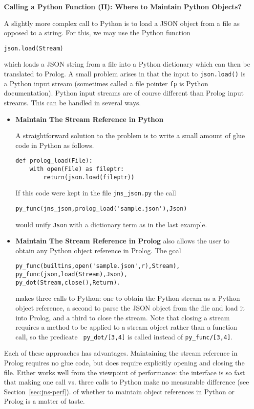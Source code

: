 \begin{example} \rm {\bf Calling a Python Function (II): Where to Maintain Python Objects?} \label{jns-examp:glue}

\noindent
A slightly more complex call to Python is to load a JSON object from a
file as opposed to a string.  For this, we may use the Python function
{\tt

  {\tt json.load(Stream)}}

\noindent
which loads a JSON string from a file into a Python dictionary which
can then be translated to Prolog.  A small problem arises in that the
input to {\tt json.load()} is a Python input stream (sometimes called
a file pointer {\tt fp} is Python documentation).  Python input
streams are of course different than Prolog input streams.  This can
be handled in several ways.

\begin{itemize}
  \item {\bf Maintain The Stream Reference in Python}

A straightforward solution to the problem is to write a small amount of
glue code in Python as follows.

\begin{verbatim}   
def prolog_load(File):
    with open(File) as fileptr:
        return(json.load(fileptr))
\end{verbatim}
\noindent
If this code were kept in the file {\tt jns\_json.py} the call
\begin{verbatim}
py_func(jns_json,prolog_load('sample.json'),Json)
\end{verbatim}
would unify {\tt Json} with a \janus{} dictionary term as in the last
example.

\item {\bf Maintain The Stream Reference in Prolog}
\janus{} also allows the user to obtain any Python object reference in
Prolog.  The goal
\begin{verbatim}   
py_func(builtins,open('sample.json',r),Stream),
py_func(json,load(Stream),Json),
py_dot(Stream,close(),Return).
\end{verbatim}
makes three calls to Python: one to obtain the Python stream as a
Python object reference, a second to parse the JSON object from the
file and load it into Prolog, and a third to close the stream.  Note
that closing a stream requires a method to be applied to a stream
object rather than a function call, so the \janus{} predicate {\tt
  py\_dot/[3,4]} is called instead of {\tt py\_func/[3,4]}.
\end{itemize}

Each of these approaches has advantages.  Maintaining the stream
reference in Prolog requires no glue code, but does require explicitly
opening and closing the file.  Either works well from the viewpoint of
performance: the \janus{} interface is so fast that making one call
vs. three calls to Python make no measurable difference (see
Section~\ref{sec:jns-perf}).  of whether to maintain object references in
Python or Prolog is a matter of taste.
\end{example}

